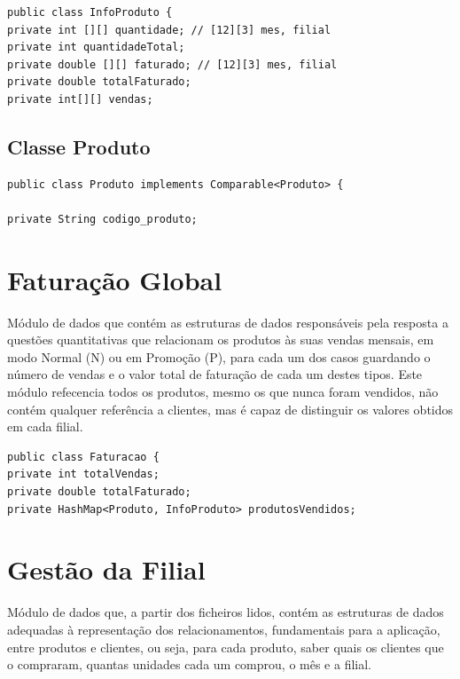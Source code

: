 \begin{verbatim}
public class InfoProduto {
private int [][] quantidade; // [12][3] mes, filial
private int quantidadeTotal;
private double [][] faturado; // [12][3] mes, filial
private double totalFaturado;
private int[][] vendas;
\end{verbatim}



\subsection{Classe Produto}


\begin{verbatim}
public class Produto implements Comparable<Produto> {

private String codigo_produto;
\end{verbatim}




\section{Faturação Global}

Módulo de dados que contém as estruturas de dados responsáveis pela resposta a questões quantitativas que relacionam os produtos às suas vendas mensais, em modo Normal (N) ou em Promoção (P), para cada um dos casos guardando o número de vendas e o valor total de faturação de cada um destes tipos. Este módulo refecencia todos os produtos, mesmo os que nunca foram vendidos, não contém qualquer referência a clientes, mas é capaz de distinguir os valores obtidos em cada filial. 

\begin{verbatim}
public class Faturacao {
private int totalVendas;
private double totalFaturado;
private HashMap<Produto, InfoProduto> produtosVendidos;
\end{verbatim}



\section{Gestão da Filial}

Módulo de dados que, a partir dos ficheiros lidos, contém as estruturas de dados adequadas à representação dos relacionamentos, fundamentais para a aplicação, entre produtos e clientes, ou seja, para cada produto, saber quais os clientes que o compraram, quantas unidades cada um comprou, o mês e a filial.

